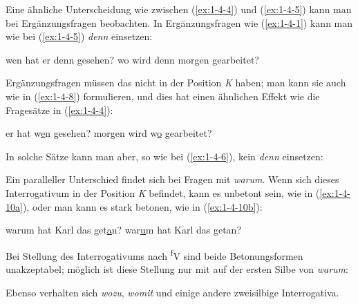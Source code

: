 \documentclass[output=paper]{langsci/langscibook}
\begin{document}
Eine ähnliche Unterscheidung wie zwischen (\ref{ex:1-4-4}) und
(\ref{ex:1-4-5}) kann man bei Ergänzungsfragen beobachten. In
Ergänzungsfragen wie (\ref{ex:1-4-1}) kann man wie bei
(\ref{ex:1-4-5}) \textit{denn} einsetzen:
\begin{exe}
\ex\label{ex:1-4-7}
\begin{xlist}
\ex\label{ex:1-4-7a} wen hat er denn gesehen?
\ex\label{ex:1-4-7b} wo wird denn morgen gearbeitet?
\end{xlist}
\end{exe}
Ergänzungsfragen müssen das  nicht in der Position \textit{K} haben;
man kann sie auch wie in (\ref{ex:1-4-8}) formulieren, und dies hat einen ähnlichen Effekt wie
die Fragesätze in (\ref{ex:1-4-4}):
\begin{exe}
\ex\label{ex:1-4-8}
\begin{xlist}
\ex\label{ex:1-4-8a} er hat w\underline{\underline{e}}n gesehen?
\ex\label{ex:1-4-8b} morgen wird w\underline{\underline{o}} gearbeitet?
\end{xlist}
\end{exe}
In solche Sätze kann man aber, so wie bei (\ref{ex:1-4-6}), kein \textit{denn} einsetzen:
\begin{exe}
\ex\label{ex:1-4-9}
\begin{xlist}
\end{xlist}
\end{exe}
Ein paralleller Unterschied findet sich bei Fragen mit \textit{warum}. Wenn sich dieses Interrogativum in der Position \textit{K} befindet, kann es unbetont sein, wie in (\ref{ex:1-4-10a}), oder
man kann es stark betonen, wie in (\ref{ex:1-4-10b}):
\begin{exe}
\ex\label{ex:1-4-10}
\begin{xlist}
\ex\label{ex:1-4-10a}
 warum hat Karl das get\underline{\underline{a}}n?
\ex\label{ex:1-4-10b}
war\underline{\underline{u}}m hat Karl das getan?
\end{xlist}
\end{exe}
Bei Stellung des Interrogativums nach \textsuperscript{f}V sind beide Betonungsformen unakzeptabel;
möglich ist diese Stellung nur mit  auf der ersten Silbe von \textit{warum}:
\begin{exe}
\ex\label{ex:1-4-11}
\begin{xlist}
\end{xlist}
\end{exe}
Ebenso verhalten sich \textit{wozu}, \textit{womit} und einige andere zweisilbige Interrogativa.
\end{document}
